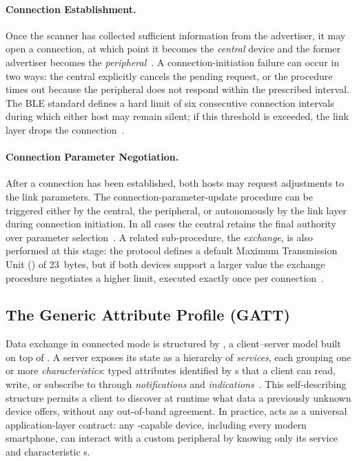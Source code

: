 \documentclass[english,bachelor]{tfgitic}[2026/01/22]
\begin{document}
\paragraph{Connection Establishment.} Once the scanner has collected sufficient information from the advertiser, it
may open a connection, at which point it becomes the \emph{central} device and
the former advertiser becomes the \emph{peripheral}~\cite{silabs_ble_flowcharts}.
A connection-initiation failure can occur in two ways: the central explicitly
cancels the pending request, or the procedure times out because the peripheral
does not respond within the prescribed interval. The BLE standard defines a
hard limit of six consecutive connection intervals during which either host may
remain silent; if this threshold is exceeded, the link layer drops the
connection~\cite{bluetooth2023core,silabs_ble_flowcharts}.

\paragraph{Connection Parameter Negotiation.} After a connection has been established, both hosts may request adjustments to
the link parameters. The connection-parameter-update procedure can be triggered
either by the central, the peripheral, or autonomously by the link layer during
connection initiation. In all cases the central retains the final authority over
parameter selection~\cite{silabs_ble_flowcharts}. A related sub-procedure, the
\emph{  exchange}, is also performed at this stage: the  protocol
defines a default Maximum Transmission Unit () of 23~bytes, but if both
devices support a larger value the  exchange procedure negotiates a higher
limit, executed exactly once per connection~\cite{bluetooth2023core}.

\subsection{The Generic Attribute Profile (GATT)}

Data exchange in connected mode is structured by , a client--server model
built on top of . A  server exposes its state as a hierarchy of
\emph{services}, each grouping one or more \emph{characteristics}: typed
attributes identified by s that a client can read, write, or subscribe to
through \emph{notifications} and
\emph{indications}~\cite{bluetooth2023core}. This self-describing structure
permits a client to discover at runtime what data a previously unknown device
offers, without any out-of-band agreement. In practice,  acts as a
universal application-layer contract: any -capable device, including every
modern smartphone, can interact with a custom peripheral by knowing only its
service and characteristic s.
\end{document}

